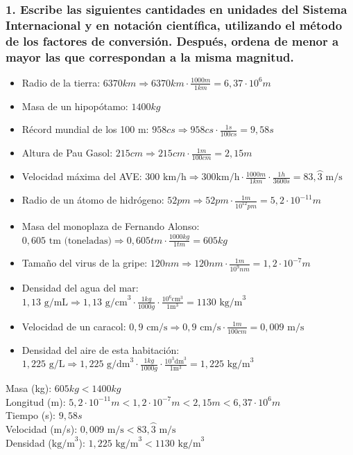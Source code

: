 \documentclass[12pt,a4paper]{article}
\begin{document}
\subsubsection*{1. Escribe las siguientes cantidades en unidades del Sistema Internacional y en notación científica, utilizando el método de los factores de conversión. Después, ordena de menor a mayor las que correspondan a la misma magnitud.}

\begin{itemize}
	\item Radio de la tierra: \(6370 km \Rightarrow 6370 km \cdot \frac{1000 m}{1 km} = 6,37 \cdot 10^6 m\)
	\item Masa de un hipopótamo: \(1400kg\)
	\item Récord mundial de los 100 m: \(958cs \Rightarrow 958cs \cdot \frac{1s}{100cs} = 9,58 s\)
	\item Altura de Pau Gasol: \(215cm \Rightarrow 215cm \cdot \frac{1m}{100cm} = 2,15m\)
	\item Velocidad máxima del AVE: \(300\text{ km/h} \Rightarrow 300\text{km/h} \cdot \frac{1000m}{1km} \cdot \frac{1h}{3600s} = 83,\wideparen{3}\text{ m/s}\)
	\item Radio de un átomo de hidrógeno: \(52pm \Rightarrow 52pm \cdot \frac{1m}{10^{12}pm} = 5,2 \cdot 10^{-11}m\)
	\item Masa del monoplaza de Fernando Alonso: \(0,605\text{ tm (toneladas)} \Rightarrow 0,605tm \cdot \frac{1000kg}{1tm} = 605kg\)
	\item Tamaño del virus de la gripe: \(120nm \Rightarrow 120nm \cdot \frac{1m}{10^9nm} = 1,2 \cdot 10^{-7}m\)
	\item Densidad del agua del mar: \(1,13\text{ g/mL} \Rightarrow 1,13\text{ g/cm}^3 \cdot \frac{1kg}{1000g} \cdot \frac{10^6\text{cm}^3}{1\text{m}^3} = 1130\text{ kg/m}^3\)
	\item Velocidad de un caracol: \(0,9\text{ cm/s} \Rightarrow 0,9\text{ cm/s} \cdot \frac{1m}{100cm} = 0,009\text{ m/s}\)
	\item Densidad del aire de esta habitación: \(1,225\text{ g/L} \Rightarrow 1,225\text{ g/dm}^3 \cdot \frac{1kg}{1000g} \cdot \frac{10^3\text{dm}^3}{1\text{m}^3} = 1,225\text{ kg/m}^3\)
\end{itemize}

\noindent Masa (kg): \(605kg < 1400kg\)\\
Longitud (m): \(5,2 \cdot 10^{-11} m < 1,2 \cdot 10^{-7} m < 2,15 m < 6,37 \cdot 10^6 m\)\\
Tiempo (s): \(9,58 s\)\\
Velocidad (m/s): \(0,009\text{ m/s} < 83,\wideparen{3}\text{ m/s}\)\\
Densidad (\(\text{kg/m}^3\)): \(1,225\text{ kg/m}^3 < 1130\text{ kg/m}^3\)
\end{document}
